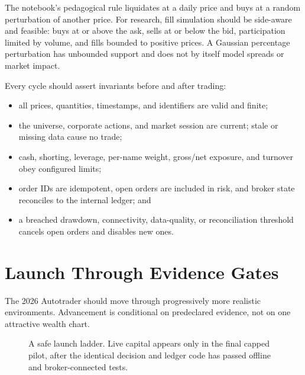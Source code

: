 \documentclass[11pt]{article}
\begin{document}
The notebook's pedagogical rule liquidates at a daily price and buys at a random perturbation of another price. For research, fill simulation should be side-aware and feasible: buys at or above the ask, sells at or below the bid, participation limited by volume, and fills bounded to positive prices. A Gaussian percentage perturbation has unbounded support and does not by itself model spreads or market impact.

Every cycle should assert invariants before and after trading:
\begin{itemize}[leftmargin=1.3em,itemsep=2pt,topsep=2pt]
  \item all prices, quantities, timestamps, and identifiers are valid and finite;
  \item the universe, corporate actions, and market session are current; stale or missing data cause no trade;
  \item cash, shorting, leverage, per-name weight, gross/net exposure, and turnover obey configured limits;
  \item order IDs are idempotent, open orders are included in risk, and broker state reconciles to the internal ledger; and
  \item a breached drawdown, connectivity, data-quality, or reconciliation threshold cancels open orders and disables new ones.
\end{itemize}

\section{Launch Through Evidence Gates}

The 2026 Autotrader should move through progressively more realistic environments. Advancement is conditional on predeclared evidence, not on one attractive wealth chart.

\begin{figure}[ht]
  \centering
  \caption{A safe launch ladder. Live capital appears only in the final capped pilot, after the identical decision and ledger code has passed offline and broker-connected tests.}
  \label{fig:launch-ladder}
\end{figure}
\end{document}
